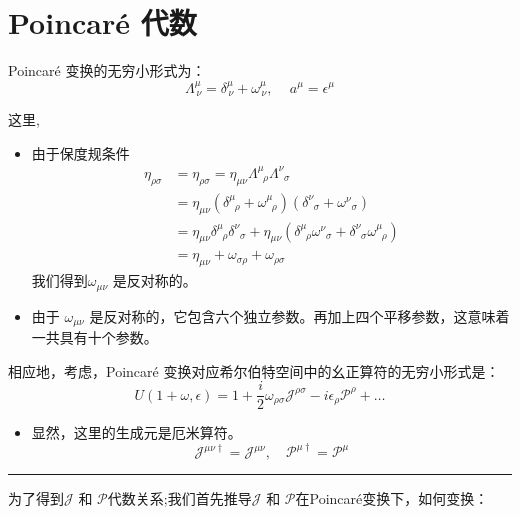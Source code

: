 
\section{Poincar\'e 代数}
Poincar\'e 变换的无穷小形式为：
\begin{equation}
    \Lambda^\mu_{\,\nu}=\delta^\mu_{\,\nu}+\omega^\mu_{\,\nu},\quad\,a^\mu=\epsilon^\mu
\end{equation}

这里,\begin{itemize}
    \item 由于保度规条件
    \[\begin{aligned}
        \eta_{\rho\sigma}&= \eta_{\rho\sigma}=\eta_{\mu\nu}\Lambda^\mu_{\;\;\rho}\Lambda^\nu_{\;\;\sigma}\\
        &=\eta_{\mu\nu}(\delta^\mu_{\;\;\rho}+\omega^\mu_{\;\;\rho})(\delta^\nu_{\;\;\sigma}+\omega^\nu_{\;\;\sigma})\\
        &=\eta_{\mu\nu}\delta^\mu_{\;\;\rho}\delta^\nu_{\;\;\sigma}+\eta_{\mu\nu}(\delta^\mu_{\;\;\rho}\omega^\nu_{\;\;\sigma}+\delta^\nu_{\;\;\sigma}\omega^\mu_{\;\;\rho})\\
        &=\eta_{\mu\nu}+\omega_{\sigma\rho}+\omega_{\rho\sigma}
    \end{aligned}\]
    我们得到\(\omega_{\mu\nu}\) 是反对称的。
    \item 由于 \(\omega_{\mu\nu}\) 是反对称的，它包含六个独立参数。再加上四个平移参数，这意味着
     一共具有十个参数。
\end{itemize}
\noindent
相应地，考虑，Poincar\'e 变换对应希尔伯特空间中的幺正算符的无穷小形式是：
\begin{equation}
    {U}(1+\omega,\epsilon)={1}+\frac{i}{2}\omega_{\rho\sigma}\mathscr{J}^{\rho\sigma}-i\epsilon_\rho \mathscr{P}^\rho+\ldots
\end{equation}
\begin{itemize}
    \item 显然，这里的生成元是厄米算符。
    \[\mathscr{J}^{\mu\nu\dagger}= \mathscr{J}^{\mu\nu},\quad \mathscr{P}^{\mu\dagger}=\mathscr{P}^\mu\]
\end{itemize}
\hrule
\vspace{2ex}
为了得到\(\mathscr{J}\) 和 \(\mathscr{P}\)代数关系;我们首先推导\(\mathscr{J}\) 和 \(\mathscr{P}\)在Poincar\'e变换下，如何变换：

